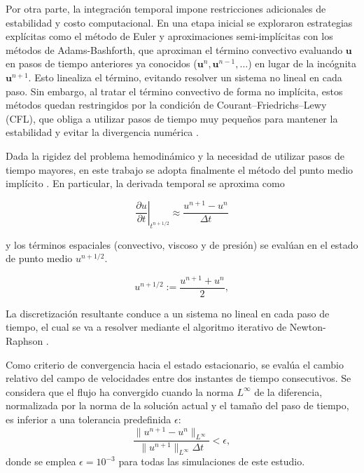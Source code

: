 \documentclass[12pt, letterpaper]{article}
\begin{document}
Por otra parte, la integración temporal impone restricciones adicionales de estabilidad y costo computacional. En una etapa inicial se exploraron estrategias explícitas como el método de Euler y aproximaciones semi-implícitas con los métodos de Adams-Bashforth, que aproximan el término convectivo evaluando $\mathbf{u}$ en pasos de tiempo anteriores ya conocidos ($\mathbf{u}^n, \mathbf{u}^{n-1}, \dots$) en lugar de la incógnita $\mathbf{u}^{n+1}$. Esto linealiza el término, evitando resolver un sistema no lineal en cada paso. Sin embargo, al tratar el término convectivo de forma no implícita, estos métodos quedan restringidos por la condición de Courant–Friedrichs–Lewy (CFL), que obliga a utilizar pasos de tiempo muy pequeños para mantener la estabilidad y evitar la divergencia numérica \cite{hirsch_numerical_2007}.

Dada la rigidez del problema hemodinámico y la necesidad de utilizar pasos de tiempo mayores, en este trabajo se adopta finalmente el método del punto medio implícito \cite{burden2016}. En particular, la derivada temporal se aproxima como

\begin{equation*}
  \label{eq:midpoint_time_derivative}
  \left.\frac{\partial u}{\partial t}\right|_{t^{n+1/2}} \approx \frac{u^{n+1}-u^n}{\Delta t}
\end{equation*}

y los términos espaciales (convectivo, viscoso y de presión) se evalúan en el estado de punto medio $u^{n+1/2}$.

\begin{equation*}
  u^{n+1/2} := \frac{u^{n+1}+u^n}{2},
\end{equation*}

La discretización resultante conduce a un sistema no lineal en cada paso de tiempo, el cual se va a resolver mediante el algoritmo iterativo de Newton-Raphson \cite{burden2016}.

Como criterio de convergencia hacia el estado estacionario, se evalúa el cambio relativo del campo de velocidades entre dos instantes de tiempo consecutivos. Se considera que el flujo ha convergido cuando la norma $L^\infty$ de la diferencia, normalizada por la norma de la solución actual y el tamaño del paso de tiempo, es inferior a una tolerancia predefinida $\epsilon$:
\begin{equation}
  \label{eq:steady_state_criterion}
  \frac{\|u^{n+1}-u^n\|_{L^\infty}}{\|u^{n+1}\|_{L^\infty}\Delta t} < \epsilon,
\end{equation}
\noindent donde se emplea $\epsilon = 10^{-3}$ para todas las simulaciones de este estudio.
\end{document}
